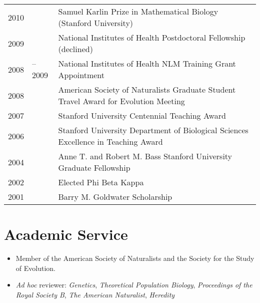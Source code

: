 \documentclass[overlapped,line]{res}
\begin{document}
\begin{resume}
\renewcommand{\arraystretch}{1.1}
\begin{tabular}{@{$\ast$ }r@{}l@{\hspace{2ex}}l}
2010 & & Samuel Karlin Prize in Mathematical Biology (Stanford University) \\ 
2009 & & National Institutes of Health Postdoctoral Fellowship (declined) \\
2008 &--2009 & National Institutes of Health NLM Training Grant Appointment \\
2008 & & American Society of Naturalists Graduate Student Travel Award for Evolution Meeting \\
2007 & & Stanford University Centennial Teaching Award \\
2006 & & Stanford University Department of Biological Sciences Excellence in Teaching Award \\
2004 & & Anne T. and Robert M. Bass Stanford University Graduate Fellowship \\
2002 & & Elected Phi Beta Kappa \\
2001 & & Barry M. Goldwater Scholarship \\
\end{tabular}


\section{\bf \large Academic Service}
\begin{itemize}[$\ast$]
\item Member of the American Society of Naturalists and the Society for the Study of Evolution.
\item \textit{Ad hoc} reviewer: \textit{Genetics}, \textit{Theoretical Population Biology}, \textit{Proceedings of the Royal Society B}, \textit{The American Naturalist}, \textit{Heredity}
\end{itemize}



\end{resume}
\end{document}
